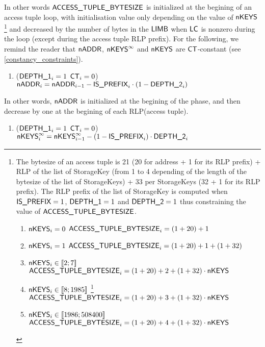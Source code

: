 In other words $\textsf{ACCESS\_TUPLE\_BYTESIZE}$ is initialized at the begining of an access tuple loop, with initialisation value only depending on the value of $\nStorageKeysInAccessEntry$ 
\footnote{The bytesize of an access tuple is 21 (20 for address + 1 for its RLP prefix) + RLP of the list of StorageKey (from 1 to 4 depending of the length of the bytesize of the list of StorageKeys) + 33 per StorageKeys (32 + 1 for its RLP prefix). The RLP prefix of the list of StorageKey is computed when $\textsf{IS\_PREFIX} = 1$, $\textsf{DEPTH\_1} =1$ and $\textsf{DEPTH\_2} = 1$ thus constraining the value of $\textsf{ACCESS\_TUPLE\_BYTESIZE}$.
\begin{enumerate}
	\item \If $\textsf{nKEYS}_{i}=0$ \Then $\textsf{ACCESS\_TUPLE\_BYTESIZE}_{i}=(1+20) + 1$
	\item \If $\textsf{nKEYS}_{i}=1$ \Then $\textsf{ACCESS\_TUPLE\_BYTESIZE}_{i}=(1+20) + 1 + (1+32)$
	\item \If $\textsf{nKEYS}_{i} \in [\![ 2 ; 7 ]\!] $ \Then $\textsf{ACCESS\_TUPLE\_BYTESIZE}_{i}= (1+20) + 2 + (1+32) \cdot \textsf{nKEYS}$
	\item \If $\textsf{nKEYS}_{i} \in [\![ 8 ; 1985  ]\!]$ \footnote{In this case the bytesize of $\nStorageKeysInAccessEntry$ RLP(StorageKey) is a two bytes integer.} \Then $\textsf{ACCESS\_TUPLE\_BYTESIZE}_{i}= (1+20) + 3 + (1+32) \cdot \textsf{nKEYS}$
	\item \If $\textsf{nKEYS}_{i} \in [\![ 1986 ; 508400]\!]$ \Then $\textsf{ACCESS\_TUPLE\_BYTESIZE}_{i}= (1+20) + 4 + (1+32) \cdot \textsf{nKEYS}$
\end{enumerate}
}
and decreased by the number of bytes in the $\textsf{LIMB}$ when $\textsf{LC}$ is nonzero during the loop (except during the access tuple RLP prefix).
\newline
For the following, we remind the reader that $\textsf{nADDR}$, $\textsf{nKEYS}^\infty$ and $\nStorageKeysInAccessEntry$ are $\textsf{CT}$-constant (see \ref{constancy_constraints}).
\begin{enumerate}[resume]
	\item \If ($\textsf{DEPTH\_1}_{i}=1$ \et $\textsf{CT}_{i}=0$) \Then $\textsf{nADDR}_{i} = \textsf{nADDR}_{i-1} - \textsf{IS\_PREFIX}_{i} \cdot (1 - \textsf{DEPTH\_2}_{i})$
\end{enumerate}
In other words, $\textsf{nADDR}$ is initialized at the begining of the phase, and then decrease by one at the begining of each RLP(access tuple).
\begin{enumerate}[resume]    
	\item \If ($\textsf{DEPTH\_1}_{i}=1$ \et $\textsf{CT}_{i}=0$) \Then $\textsf{nKEYS}^\infty_{i} = \textsf{nKEYS}^\infty_{i-1} - (1- \textsf{IS\_PREFIX}_{i}) \cdot \textsf{DEPTH\_2}_{i}$
\end{enumerate}
